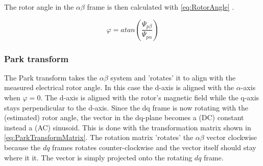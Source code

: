 \documentclass[]{report}
\begin{document}
The rotor angle in the $\alpha\beta$ frame is then calculated with \autoref{eq:RotorAngle} \cite{Infineon_sensorless_FOC}.

\begin{equation} \label{eq:RotorAngle}
	\varphi = atan\left(\frac{\Psi_{p\beta}}{\Psi_{p\alpha}}\right)
\end{equation}







\subsubsection{Park transform}
The Park transform takes the $\alpha\beta$ system and 'rotates' it to align with the measured electrical rotor angle. In this case the d-axis is aligned with the $\alpha$-axis when $\varphi=0$. The d-axis is aligned with the rotor's magnetic field while the q-axis stays perpendicular to the d-axis. Since the dq frame is now rotating with the (estimated) rotor angle, the vector in the dq-plane becomes a (DC) constant instead a (AC) sinusoid. This is done with the transformation matrix shown in \autoref{eq:ParkTransformMatrix}. The rotation matrix 'rotates' the $\alpha\beta$ vector clockwise because the $dq$ frames rotates counter-clockwise and the vector itself should stay where it it. The vector is simply projected onto the rotating $dq$ frame.
\end{document}
